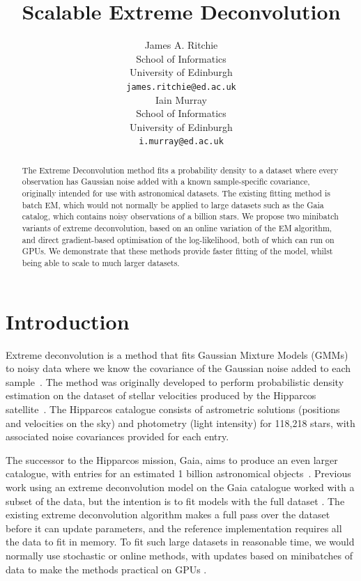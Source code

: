 \documentclass{article}
\title{Scalable Extreme Deconvolution}
\author{
  James A. Ritchie\\
  School of Informatics\\
  University of Edinburgh\\
   \texttt{james.ritchie@ed.ac.uk} \\
  \And
  Iain Murray\\
  School of Informatics\\
  University of Edinburgh\\
   \texttt{i.murray@ed.ac.uk} \\
}
\begin{document}
\maketitle

\begin{abstract}

The Extreme Deconvolution method fits a probability density to a dataset where every observation has Gaussian noise added with a known sample-specific covariance, originally intended for use with astronomical datasets.
The existing fitting method is batch EM, which would not normally be applied to large datasets such as the Gaia catalog, which contains noisy observations of a billion stars.
We propose two minibatch variants of extreme deconvolution, based on an online variation of the EM algorithm, and direct gradient-based optimisation of the log-likelihood, both of which can run on GPUs.
We demonstrate that these methods provide faster fitting of the model, whilst being able to scale to much larger datasets.

\end{abstract}

\section{Introduction}

Extreme deconvolution is a method that fits Gaussian Mixture Models (GMMs) to noisy data where we know the covariance of the Gaussian noise added to each sample~\cite{bovyExtremeDeconvolutionInferring2011}.
The method was originally developed to perform probabilistic density estimation on the dataset of stellar velocities produced by the Hipparcos satellite~\cite{perrymanHipparcosCatalogue1997}.
The Hipparcos catalogue consists of astrometric solutions (positions and velocities on the sky) and photometry (light intensity) for 118,218 stars, with associated noise covariances provided for each entry.

The successor to the Hipparcos mission, Gaia, aims to produce an even larger catalogue, with entries for an estimated 1 billion astronomical objects~\cite{collaborationGaiaMission2016}.
Previous work using an extreme deconvolution model on the Gaia catalogue %
worked with a subset of the data,
but the intention is to fit models with the full dataset
\cite{andersonImprovingGaiaParallax2018}.
The existing extreme deconvolution algorithm makes a full pass over the dataset before it can update parameters, and the reference implementation requires all the data to fit in memory. To fit such large datasets in reasonable time, we would normally use stochastic or online methods, with updates based on minibatches of data to make the methods practical on GPUs \cite{bottou2018}.
\end{document}
